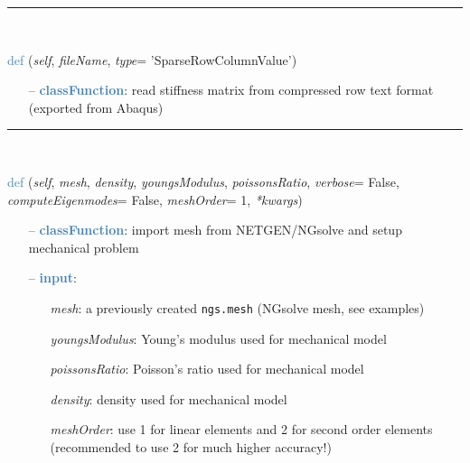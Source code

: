 \begin{itemize}[leftmargin=1.4cm]
\begin{itemize}[leftmargin=1.4cm]
\begin{itemize}[leftmargin=0.5cm]
\begin{itemize}[leftmargin=1.4cm]
\begin{itemize}[leftmargin=1.4cm]
\begin{itemize}[leftmargin=0.5cm]
%
\noindent\rule{8cm}{0.75pt}\vspace{1pt} \\ 
\begin{flushleft}
\noindent \textcolor{steelblue}{def {\bf {}}}\label{sec:FEM:FEMinterface:ReadStiffnessMatrixFromAbaqus}
({\it self}, {\it fileName}, {\it type}= 'SparseRowColumnValue')
\end{flushleft}
\setlength{\itemindent}{0.7cm}
\begin{itemize}[leftmargin=0.7cm]
\item[--]\textcolor{steelblue}{\bf classFunction}: read stiffness matrix from compressed row text format (exported from Abaqus)
\vspace{12pt}\end{itemize}
%
\noindent\rule{8cm}{0.75pt}\vspace{1pt} \\ 
\begin{flushleft}
\noindent \textcolor{steelblue}{def {\bf {}}}\label{sec:FEM:FEMinterface:ImportMeshFromNGsolve}
({\it self}, {\it mesh}, {\it density}, {\it youngsModulus}, {\it poissonsRatio}, {\it verbose}= False, {\it computeEigenmodes}= False, {\it meshOrder}= 1, {\it **kwargs})
\end{flushleft}
\setlength{\itemindent}{0.7cm}
\begin{itemize}[leftmargin=0.7cm]
\item[--]\textcolor{steelblue}{\bf classFunction}: import mesh from NETGEN/NGsolve and setup mechanical problem
\item[--]\textcolor{steelblue}{\bf input}: \vspace{-6pt}
\begin{itemize}[leftmargin=1.2cm]
\setlength{\itemindent}{-0.7cm}
\item[]{\it mesh}: a previously created \texttt{ngs.mesh} (NGsolve mesh, see examples)
\item[]{\it youngsModulus}: Young's modulus used for mechanical model
\item[]{\it poissonsRatio}: Poisson's ratio used for mechanical model
\item[]{\it density}: density used for mechanical model
\item[]{\it meshOrder}: use 1 for linear elements and 2 for second order elements (recommended to use 2 for much higher accuracy!)

\end{itemize}
\end{itemize}
\end{itemize}
\end{itemize}
\end{itemize}
\end{itemize}
\end{itemize}
\end{itemize}

